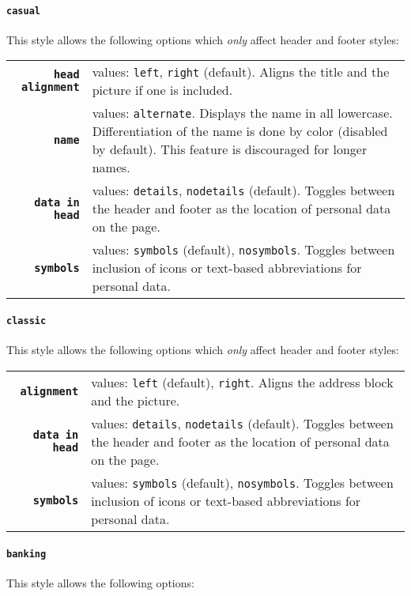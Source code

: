 \documentclass[a4paper, 11pt]{article}
\newcommand{\code}[1]{\lstinline!#1!}
\begin{document}
\paragraph{\code{casual}}
This style allows the following options which \emph{only} affect header and footer styles:

\begin{tabular}{r@{\hspace{2ex}}p{}}
  \textbf{\code{head alignment}} & values: \code{left}, \code{right} (default).
  Aligns the title and the picture if one is included. \\
  \textbf{\code{name}}           & values: \code{alternate}.
  Displays the name in all lowercase.
  Differentiation of the name is done by color (disabled by default).
  This feature is discouraged for longer names. \\
  \textbf{\code{data in head}}   & values: \code{details}, \code{nodetails} (default).
  Toggles between the header and footer as the location of personal data on the page. \\
  \textbf{\code{symbols}}        & values: \code{symbols} (default), \code{nosymbols}.
  Toggles between inclusion of icons or text-based abbreviations for personal data.
\end{tabular}

\paragraph{\code{classic}}
This style allows the following options which \emph{only} affect header and footer styles:

\begin{tabular}{r@{\hspace{2ex}}p{}}
  \textbf{\code{alignment}}    & values: \code{left} (default), \code{right}.
  Aligns the address block and the picture. \\
  \textbf{\code{data in head}} & values: \code{details}, \code{nodetails} (default).
  Toggles between the header and footer as the location of personal data on the page. \\
  \textbf{\code{symbols}}      & values: \code{symbols} (default), \code{nosymbols}.
  Toggles between inclusion of icons or text-based abbreviations for personal data.
\end{tabular}

\paragraph{\code{banking}}
This style allows the following options:
\end{document}
